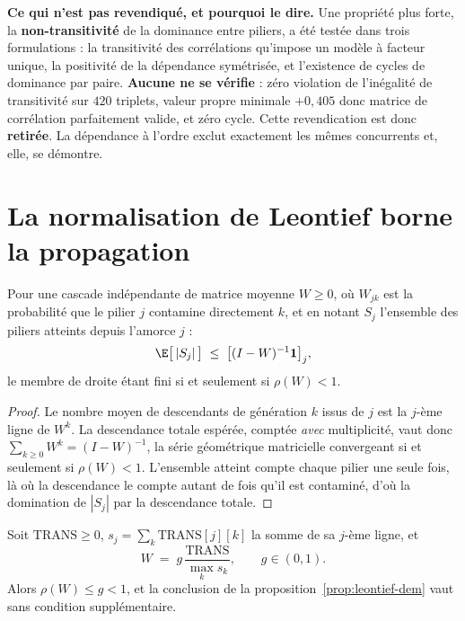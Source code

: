 \begin{cle}
\textbf{Ce qui n'est pas revendiqué, et pourquoi le dire.} Une propriété plus forte, la
\textbf{non-transitivité} de la dominance entre piliers, a été testée dans trois
formulations : la transitivité des corrélations qu'impose un modèle à facteur unique, la
positivité de la dépendance symétrisée, et l'existence de cycles de dominance par paire.
\textbf{Aucune ne se vérifie} : zéro violation de l'inégalité de transitivité sur $420$
triplets, valeur propre minimale $+0{,}405$ donc matrice de corrélation parfaitement
valide, et zéro cycle. Cette revendication est donc \textbf{retirée}. La dépendance à
l'ordre exclut exactement les mêmes concurrents et, elle, se démontre.
\end{cle}

\section{La normalisation de Leontief borne la propagation}

\begin{proposition}\label{prop:leontief-dem}
Pour une cascade indépendante de matrice moyenne $W\geq 0$, où $W_{jk}$ est la probabilité que
le pilier $j$ contamine directement $k$, et en notant $S_j$ l'ensemble des piliers atteints
depuis l'amorce $j$ :
\begin{equation}
  \E\bigl[\,|S_j|\,\bigr] \;\leq\; \bigl[(I-W)^{-1}\mathbf{1}\bigr]_j ,
  \label{eq:borne-leontief}
\end{equation}
le membre de droite étant fini si et seulement si $\rho(W) < 1$.
\end{proposition}

\begin{proof}
Le nombre moyen de descendants de génération $k$ issus de $j$ est la $j$-ème ligne de $W^{k}$.
La descendance totale espérée, comptée \emph{avec} multiplicité, vaut donc
$\sum_{k\geq 0} W^{k} = (I-W)^{-1}$, la série géométrique matricielle convergeant si et
seulement si $\rho(W)<1$. L'ensemble atteint compte chaque pilier une seule fois, là où la
descendance le compte autant de fois qu'il est contaminé, d'où la domination de $|S_j|$ par la
descendance totale.
\end{proof}

\begin{proposition}\label{prop:souscritique}
Soit $\mathrm{TRANS}\geq 0$, $s_j=\sum_k \mathrm{TRANS}[j][k]$ la somme de sa $j$-ème ligne, et
\begin{equation}
  W \;=\; g\,\frac{\mathrm{TRANS}}{\max_k s_k},
  \qquad g\in(0,1).
  \label{eq:normalisation-leontief}
\end{equation}
Alors $\rho(W)\leq g<1$, et la conclusion de la proposition~\ref{prop:leontief-dem} vaut sans
condition supplémentaire.
\end{proposition}

